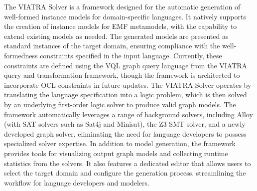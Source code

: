 
The VIATRA Solver is a framework designed for the automatic generation of well-formed instance models for domain-specific languages. 
It natively supports the creation of instance models for EMF metamodels, with the capability to extend existing models as needed. 
The generated models are presented as standard instances of the target domain, ensuring compliance with the well-formedness constraints specified in the input language. 
Currently, these constraints are defined using the VQL graph query language from the VIATRA query and transformation framework, though the framework is architected to incorporate OCL constraints in future updates.
The VIATRA Solver operates by translating the language specification into a logic problem, which is then solved by an underlying first-order logic solver to produce valid graph models. 
The framework automatically leverages a range of background solvers, including Alloy (with SAT solvers such as Sat4j and Minisat), the Z3 SMT solver, and a newly developed graph solver, eliminating the need for language developers to possess specialized solver expertise. 
In addition to model generation, the framework provides tools for visualizing output graph models and collecting runtime statistics from the solvers. It also features a dedicated editor that allows users to select the target domain and configure the generation process, streamlining the workflow for language developers and modelers.
